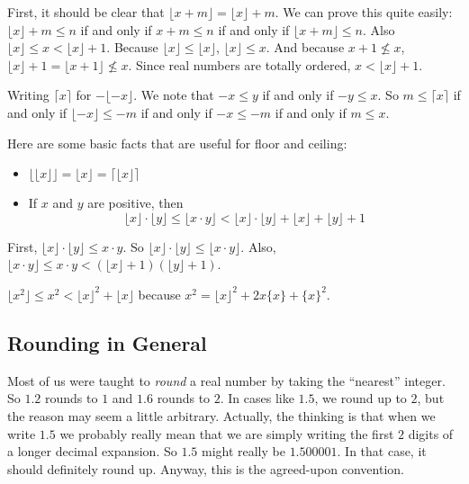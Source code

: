 \documentclass[10pt,oneside,tightlist]{memoir}
\begin{document}
First, it should be clear that $\lfloor x + m\rfloor = \lfloor x\rfloor + m$. We can prove this quite easily:
$\lfloor x\rfloor + m \leq n$ if and only if $x+m \leq n$ if and only if $\lfloor x+m\rfloor \leq n$. 
Also $\lfloor x\rfloor \leq x < \lfloor x\rfloor + 1$. Because $\lfloor x\rfloor \leq \lfloor x\rfloor$,
$\lfloor x\rfloor \leq x$. And because $x+1\nleq x$, $\lfloor x\rfloor + 1 = \lfloor x+1\rfloor \nleq x$.
Since real numbers are totally ordered, $x< \lfloor x\rfloor + 1$.

Writing $\lceil x\rceil$ for $-\lfloor -x\rfloor$. We note that $-x\leq y$ if and only if $-y \leq x$. So
$m\leq \lceil x\rceil$ if and only if $\lfloor -x \rfloor \leq -m$ if and only if $-x\leq -m$ if and only if
$m\leq x$.

Here are some basic facts that are useful for floor and ceiling:

\begin{itemize}
\item $\lfloor\lfloor x\rfloor\rfloor = \lfloor x\rfloor = \lceil\lfloor x \rfloor\rceil$
\item If $x$ and $y$ are positive, then 
\[\lfloor x\rfloor\cdot \lfloor y\rfloor 
    \leq \lfloor x\cdot y\rfloor
    <    \lfloor x\rfloor \cdot \lfloor y\rfloor + \lfloor x\rfloor + \lfloor y\rfloor + 1\]
\end{itemize}

First, $\lfloor x\rfloor \cdot \lfloor y\rfloor \leq x\cdot y$. So $\lfloor x\rfloor \cdot \lfloor y\rfloor \leq \lfloor x\cdot y\rfloor$.
Also, $\lfloor x\cdot y\rfloor \leq x\cdot y< (\lfloor x\rfloor + 1)(\lfloor y\rfloor + 1)$.

$\lfloor x^2\rfloor \leq x^2 < \lfloor x\rfloor^2 + \lfloor x\rfloor$ because $x^2 = \lfloor x\rfloor^2 + 2x\{x\} + \{x\}^2$. 
 

\subsection{Rounding in General}

Most of us were taught to \emph{round} a real number by taking the ``nearest'' integer. So $1.2$ rounds to $1$ and $1.6$ rounds to $2$.
In cases like $1.5$, we round up to $2$, but the reason may seem a little arbitrary. Actually, the thinking is that when we write $1.5$
we probably really mean that we are simply writing the first $2$ digits of a longer decimal expansion. So $1.5$ might really be $1.500001$.
In that case, it should definitely round up. Anyway, this is the agreed-upon convention.
\end{document}
